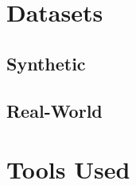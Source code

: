 





\section{Datasets}


\subsection{Synthetic}


\subsection{Real-World}


\section{Tools Used}




